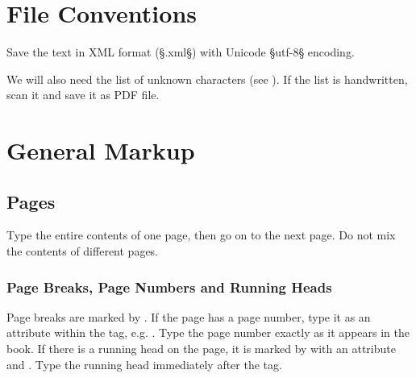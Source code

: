 


\section{File Conventions}
\label{section file conventions}

\begin{mainruleLessImportant}
Save the text in XML format (§.xml§) with Unicode §utf-8§ encoding.

We will also need the list of unknown characters (see ). If the list is handwritten, scan it and save it as PDF file.
\end{mainruleLessImportant}


\section{General Markup}

\tocspace
\subsection{Pages}

\begin{mainrule}
Type the entire contents of one page, then go on to the next page. Do not mix the contents of different pages.
\end{mainrule}

\subsubsection{Page Breaks, Page Numbers and Running Heads}
\label{section page breaks}

\begin{mainrule}
Page breaks are marked by . If the page has a page number, type it as an attribute  within the  tag, e.g. . Type the page number exactly as it appears in the book. If there is a running head on the page, it is marked by  with an attribute  and . Type the running head immediately after the  tag.
\end{mainrule}

